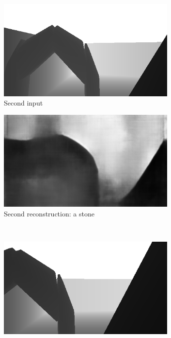 \begin{figure}[H]
\begin{subfigure}[b]{0.49\textwidth}
        \includegraphics[width=0.98\textwidth]{figures/9_/64_0_a_pre_image.png}
        \caption{Second input}
        \label{fig:64_0_a_pre_image}
    \end{subfigure} 
    \hfill
    \begin{subfigure}[b]{0.49\textwidth}
        \centering
        \captionsetup{justification=centering}
        \includegraphics[width=0.98\textwidth]{figures/9_/64_0_c_vae_image.png}
        \caption{Second reconstruction: a stone}
        \label{fig:64_0_c_vae_image}
    \end{subfigure} 
    \\
    \begin{subfigure}[b]{0.49\textwidth}
        \centering
        \captionsetup{justification=centering}
        \includegraphics[width=0.98\textwidth]{figures/9_/66_0_a_pre_image.png}

\end{subfigure}
\end{figure}
